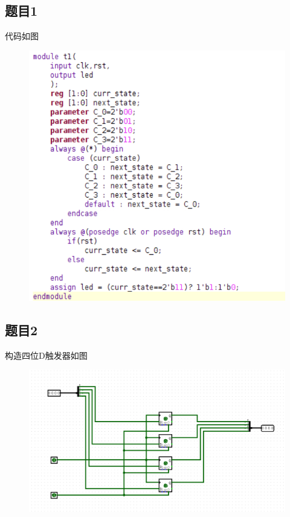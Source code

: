 \documentclass{article}
\begin{document}
    \subsection*{题目1}
		代码如图
		\begin{figure}[htbp]
			\centering
			\includegraphics[scale=0.8]{1v.png}
		\end{figure}

    \subsection*{题目2} 
		构造四位D触发器如图
		\begin{figure}[htbp]
			\centering
			\includegraphics[scale=0.5]{2ld.png}
		\end{figure}
\end{document}
